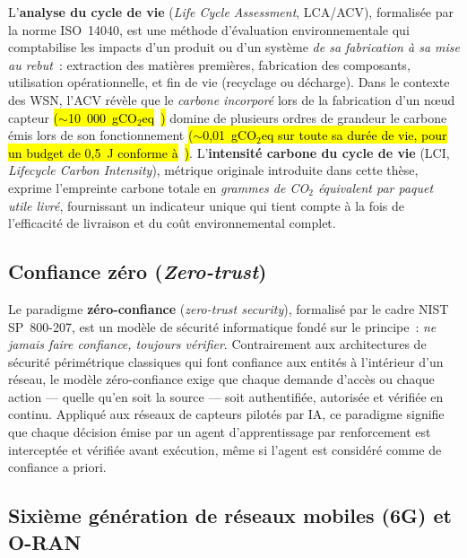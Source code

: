 L'\textbf{analyse du cycle de vie} (\emph{Life Cycle Assessment}, LCA/ACV), formalisée par la norme ISO~14040, est une méthode d'évaluation environnementale qui comptabilise les impacts d'un produit ou d'un système \emph{de sa fabrication à sa mise au rebut}~: extraction des matières premières, fabrication des composants, utilisation opérationnelle, et fin de vie (recyclage ou décharge). Dans le contexte des WSN, l'ACV révèle que le \emph{carbone incorporé} lors de la fabrication d'un nœud capteur \hl{($\sim$10~000~gCO$_2$eq}~\cite{pirson2021embodied}\hl{)} domine de plusieurs ordres de grandeur le carbone émis lors de son fonctionnement \hl{($\sim$0,01~gCO$_2$eq sur toute sa durée de vie, pour un budget de 0{,}5~J conforme à}~\cite{heinzelman2000leach}\hl{)}. L'\textbf{intensité carbone du cycle de vie} (LCI, \emph{Lifecycle Carbon Intensity}), métrique originale introduite dans cette thèse, exprime l'empreinte carbone totale en \emph{grammes de CO$_2$ équivalent par paquet utile livré}, fournissant un indicateur unique qui tient compte à la fois de l'efficacité de livraison et du coût environnemental complet.

\subsection*{Confiance zéro (\emph{Zero-trust})}

Le paradigme \textbf{zéro-confiance} (\emph{zero-trust security}), formalisé par le cadre NIST SP~800-207, est un modèle de sécurité informatique fondé sur le principe~: \emph{ne jamais faire confiance, toujours vérifier}. Contrairement aux architectures de sécurité périmétrique classiques qui font confiance aux entités à l'intérieur d'un réseau, le modèle zéro-confiance exige que chaque demande d'accès ou chaque action --- quelle qu'en soit la source --- soit authentifiée, autorisée et vérifiée en continu. Appliqué aux réseaux de capteurs pilotés par IA, ce paradigme signifie que chaque décision émise par un agent d'apprentissage par renforcement est interceptée et vérifiée avant exécution, même si l'agent est considéré comme \og{}de confiance\fg{} a priori.

\subsection*{Sixième génération de réseaux mobiles (6G) et O-RAN}

